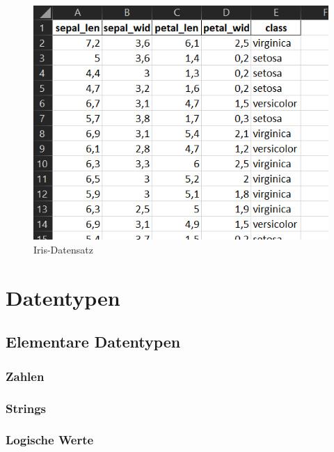\documentclass[
  oneside]{book}
\begin{document}
\begin{figure}
\centering
\includegraphics{assets/daten.assets/image-20211209101425856-16426070878651.png}
\caption{Iris-Datensatz}
\end{figure}

\hypertarget{datentypen-1}{%
\section{Datentypen}\label{datentypen-1}}

\hypertarget{elementare-datentypen-1}{%
\subsection{Elementare Datentypen}\label{elementare-datentypen-1}}

\hypertarget{zahlen-1}{%
\subsubsection{Zahlen}\label{zahlen-1}}

\hypertarget{strings}{%
\subsubsection{Strings}\label{strings}}

\hypertarget{logische-werte}{%
\subsubsection{Logische Werte}\label{logische-werte}}
\end{document}
